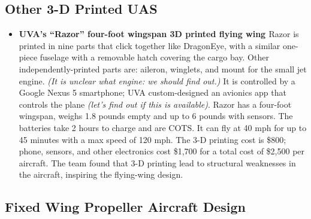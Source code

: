 \documentclass{article}
\begin{document}
\subsection{Other 3-D Printed UAS}

\begin{itemize}

\item {\bf UVA's ``Razor'' four-foot wingspan 3D printed flying wing \cite{Gol14}} Razor is printed in nine parts that click together like DragonEye, with a similar one-piece fuselage with a removable hatch covering the cargo bay. Other independently-printed parts are: aileron, winglets, and mount for the small jet engine. \emph{(It is unclear what engine: we should find out.)} It is controlled by a Google Nexus 5 smartphone; UVA custom-designed an avionics app that controls the plane \emph{(let's find out if this is available)}. Razor has a four-foot wingspan, weighs 1.8 pounds empty and up to 6 pounds with sensors. The batteries take 2 hours to charge and are COTS. It can fly at 40 mph for up to 45 minutes with a max speed of 120 mph. The 3-D printing cost is \$800; phone, sensors, and other electronics cost \$1,700 for a total cost of \$2,500 per aircraft. The team found that 3-D printing lead to structural weaknesses in the aircraft, inspiring the flying-wing design.

\end{itemize}

\subsection{Fixed Wing Propeller Aircraft Design}
\end{document}
